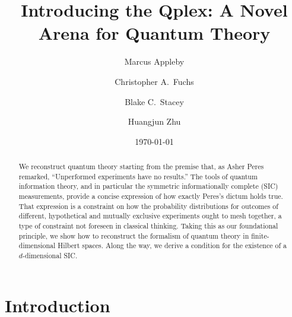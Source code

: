 \documentclass[aps,pra,superscriptaddress,10pt,tightenlines,twocolumn,nofootinbib]{revtex4}
\theoremstyle{remark}
\begin{document}
\title{Introducing the Qplex: A Novel Arena for Quantum Theory}

\author{Marcus Appleby}
\author{Christopher A.\ Fuchs}
\author{Blake C.\ Stacey}

\author{Huangjun Zhu}


\date{\today}

\begin{abstract}
We reconstruct quantum theory starting from the premise that, as Asher Peres remarked, ``Unperformed experiments have no results.''  The tools of quantum information theory, and in particular the symmetric informationally complete (SIC) measurements, provide a concise expression of how exactly Peres's dictum holds true.  That expression is a constraint on how the probability distributions for outcomes of different, hypothetical and mutually exclusive experiments ought to mesh together, a type of constraint not foreseen in classical thinking.  Taking this as our foundational principle, we show how to reconstruct the formalism of quantum theory in finite-dimensional Hilbert spaces.  Along the way, we derive a condition for the existence of a $d$-dimensional SIC.
\end{abstract}

\maketitle

\setcounter{assump}{-1}

\section{Introduction}


%
\end{document}
